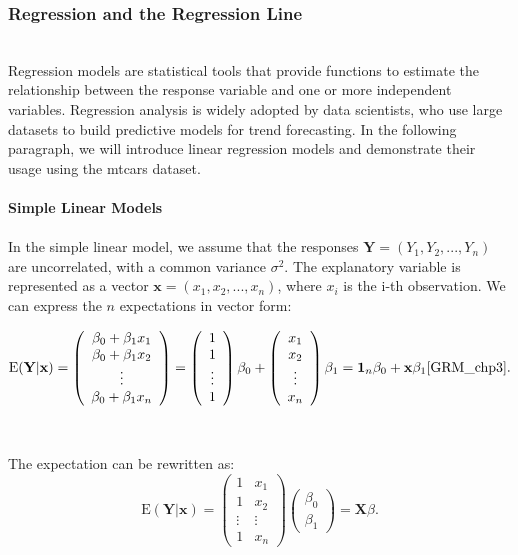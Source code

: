 \documentclass{article}\usepackage[]{graphicx}\usepackage[]{xcolor}
\begin{document}
\subsubsection{Regression and the Regression Line}
\\Regression models are statistical tools that provide functions to estimate the relationship between the response variable and one or more independent variables. Regression analysis is widely adopted by data scientists, who use large datasets to build predictive models for trend forecasting. In the following paragraph, we will introduce linear regression models and demonstrate their usage using the mtcars dataset.\\

\\\textbf{Simple Linear Models}\\
\\In the simple linear model, we assume that the responses $\mathbf{Y} = (Y_1, Y_2, ..., Y_n)$ are uncorrelated, with a common variance $\sigma^2$. The explanatory variable is represented as a vector $\mathbf{x} = (x_1, x_2, ..., x_n)$, where $x_i$ is the i-th observation.  We can express the $n$ expectations in vector form:

$$\mathrm{E}(\mathbf{Y} | \mathbf{x}) =
\left( \begin{array}{ccc}
\beta_0+\beta_1 x_1\\
\beta_0+\beta_1 x_2\\
\vdots\\
\beta_0+\beta_1 x_n
\end{array} \right) = 
\left( \begin{array}{ccc}
1\\
1\\
\vdots\\
1
\end{array} \right) \beta_0 + 
\left( \begin{array}{ccc}
x_1\\
x_2\\
\vdots\\
x_n
\end{array} \right) \beta_1 =
\mathbf{1}_n \beta_0 + \mathbf{x} \beta_1 \cite{GRM_chp3}.
$$ 
\\  
\\The expectation can be rewritten as: 
$$\mathrm{E}(\mathbf{Y} | \mathbf{x}) = 
\left( \begin{array}{cc}
1 & x_1\\
1  & x_2\\
\vdots& \vdots\\
1  & x_n
\end{array} \right) 
\left( \begin{array}{cc}
\beta_0 \\
\beta_1
\end{array} \right) = \mathbf{X} \beta.
$$
\end{document}
